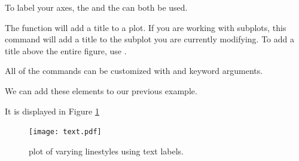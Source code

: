 To label your axes, the  and the  can both be used. 

The function  will add a title to a plot.
If you are working with subplots, this command will add a title to the subplot you are currently modifying.
To add a title above the entire figure, use .


All of the  commands can be customized with  and  keyword arguments. 

We can add these elements to our previous example. 

It is displayed in Figure \ref{text}


\begin{figure} 
\texttt{[image: text.pdf]}
\caption{plot of varying linestyles using text labels.}
\label{text} 
\end{figure}

